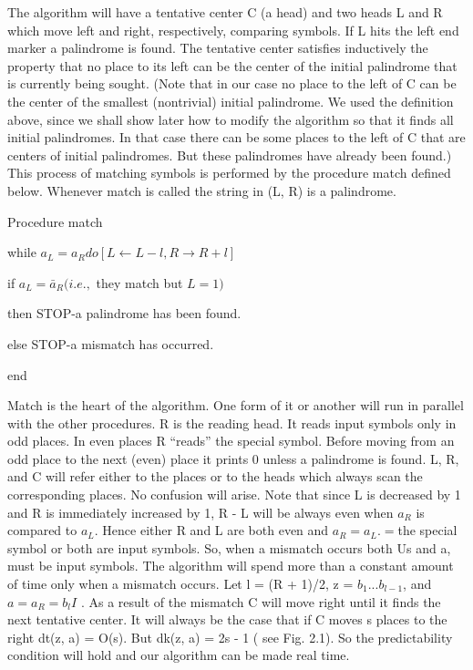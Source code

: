 \documentclass[11pt,a4paper]{report}
\begin{document}
The algorithm will have a tentative center C (a head) and two heads L and R which
move left and right, respectively, comparing symbols. If L hits the left end marker a
palindrome is found. The tentative center satisfies inductively the property that no place
to its left can be the center of the initial palindrome that is currently being sought.
(Note that in our case no place to the left of C can be the center of the smallest (nontrivial)
initial palindrome. We used the definition above, since we shall show later how to modify
the algorithm so that it finds all initial palindromes. In that case there can be some places
to the left of C that are centers of initial palindromes. But these palindromes have already
been found.) This process of matching symbols is performed by the procedure match
defined below. Whenever match is called the string in (L, R) is a palindrome.

Procedure match
\begin{myindentpar}{2em}

while $ a_L=a_R do[L\leftarrow L-l,R \rightarrow R+l]$
\begin{myindentpar}{2em}

if $a_L = \bar{a}_R (i.e.,$ they  match but  $L = 1)$
\begin{myindentpar}{2em}

then STOP-a palindrome has been found.
\end{myindentpar}

else STOP-a mismatch has occurred.

\end{myindentpar}

\end{myindentpar}

end

Match is the heart of the algorithm. One form of it or another will run in parallel with
the other procedures. R is the reading head. It reads input symbols only in odd places.
In even places R “reads” the special symbol. Before moving from an odd place to the
next (even) place it prints 0 unless a palindrome is found. L, R, and C will refer either to
the places or to the heads which always scan the corresponding places. No confusion will
arise. Note that since L is decreased by 1 and R is immediately increased by 1, R - L
will be always even when $a_R$ is compared to $a_L$. Hence either R and L are both even and
$a_R = a_L. = $the special symbol or both are input symbols. So, when a mismatch occurs
both Us and a, must be input symbols. The algorithm will spend more than a constant
amount of time only when a mismatch occurs. Let l = (R + 1)/2, z = $b_1 ... b_{l-1}$, and 
$a=a_R= b_l I$ . As a result of the mismatch C will move right until it finds the next
tentative center. It will always be the case that if C moves s places to the right dt(z, a) =
O(s). But  dk(z, a) = 2s - 1 ( see Fig. 2.1). So the predictability condition will hold and
our algorithm can be made real time.
\end{document}
